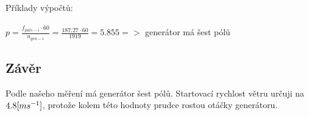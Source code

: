 \documentclass{article}
\begin{document}
Příklady výpočtů: \\
\\
\large
\(
  p = \frac{f_{puls-i}\cdot 60}{n_{gen-i}} = \frac{187.27 \cdot 60}{1919} = 5.855 => \) generátor má šest pólů 
\normalsize \\

\subsection{Závěr}
Podle našeho měření má generátor šest pólů.
Startovací rychlost větru určuji na \(4.8\-[ms^{-1}]\), protože kolem této hodnoty prudce rostou otáčky generátoru.
\end{document}
